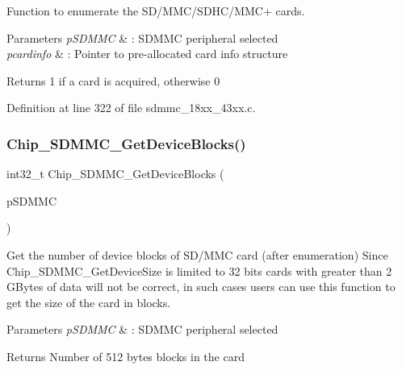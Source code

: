 Function to enumerate the S\+D/\+M\+M\+C/\+S\+D\+H\+C/\+M\+M\+C+ cards. 


\begin{DoxyParams}{Parameters}
{\em p\+S\+D\+M\+MC} & \+: S\+D\+M\+MC peripheral selected \\
\hline
{\em pcardinfo} & \+: Pointer to pre-\/allocated card info structure \\
\hline
\end{DoxyParams}
\begin{DoxyReturn}{Returns}
1 if a card is acquired, otherwise 0 
\end{DoxyReturn}


Definition at line 322 of file sdmmc\+\_\+18xx\+\_\+43xx.\+c.

\mbox{\label{group___s_d_m_m_c__18_x_x__43_x_x_gad6a8510859b4572e2caa914c236dcae0}} 
\subsubsection{\texorpdfstring{Chip\+\_\+\+S\+D\+M\+M\+C\+\_\+\+Get\+Device\+Blocks()}{Chip\_SDMMC\_GetDeviceBlocks()}}
{\footnotesize\ttfamily int32\+\_\+t Chip\+\_\+\+S\+D\+M\+M\+C\+\_\+\+Get\+Device\+Blocks (\begin{DoxyParamCaption}\item[{\hyperlink{struct_l_p_c___s_d_m_m_c___t}{L\+P\+C\+\_\+\+S\+D\+M\+M\+C\+\_\+T} $\ast$}]{p\+S\+D\+M\+MC }\end{DoxyParamCaption})}



Get the number of device blocks of S\+D/\+M\+MC card (after enumeration) Since Chip\+\_\+\+S\+D\+M\+M\+C\+\_\+\+Get\+Device\+Size is limited to 32 bits cards with greater than 2 G\+Bytes of data will not be correct, in such cases users can use this function to get the size of the card in blocks. 


\begin{DoxyParams}{Parameters}
{\em p\+S\+D\+M\+MC} & \+: S\+D\+M\+MC peripheral selected \\
\hline
\end{DoxyParams}
\begin{DoxyReturn}{Returns}
Number of 512 bytes blocks in the card 
\end{DoxyReturn}


